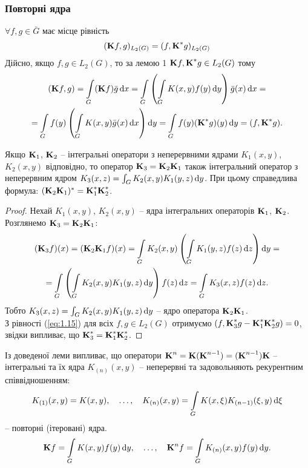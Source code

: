 \subsubsection{Повторні ядра}

$\forall f, g \in \bar G$ має місце рівність 
\begin{equation}
	\label{eq:1.15}
	(\bf{K}f,g)_{L_2(G)} = (f, \bf{K}^*g)_{L_2(G)}
\end{equation}
Дійсно, якщо $f, g \in L_2(G)$, то за лемою 1 $\bf{K}f, \bf{K}^*g \in L_2(G)$ тому
\begin{multline*}
	(\bf{K}f, g) = \Int_G (\bf{K}f)\bar g \diff x = \Int_G \left( \Int_G K(x, y) f(y) \diff y\right) \bar g(x) \diff x = \\
	= \Int_G f(y) \left( \Int_G K(x, y) \bar g(x) \diff x\right) \diff y = \Int_G f(y) (\bf{K}^* g)(y) \diff y = (f, \bf{K}^*g).
\end{multline*}

\begin{lemma}
	Якщо $\bf{K}_1$, $\bf{K}_2$ -- інтегральні оператори з неперервними ядрами $K_1(x, y)$, $K_2(x, y)$ відповідно, то оператор $\bf{K}_3 = \bf{K}_2 \bf{K}_1$ також інтегральний оператор з неперервним ядром $K_3(x, z) = \int_G K_2(x, y) K_1(y, z) \diff y$. При цьому справедлива формула: $(\bf{K}_2\bf{K}_1)^* = \bf{K}_1^* \bf{K}_2^*$.
\end{lemma}
\begin{proof}
	Нехай $K_1(x, y)$, $K_2(x, y)$ -- ядра інтегральних операторів $\bf{K}_1$, $\bf{K}_2$. Розглянемо $\bf{K}_3 = \bf{K}_2 \bf{K}_1$:
	\begin{multline*}
		(\bf{K}_3 f)(x) = (\bf{K}_2\bf{K}_1f)(x) = \Int_G K_2(x, y) \left( \Int_G K_1(y, z) f(z) \diff z \right) \diff y = \\
		= \Int_G \left( \Int_G K_2(x, y) K_1(y, z) \diff y\right) f(z) \diff z = \Int_G K_3(x, z) f(z) \diff z.
	\end{multline*}
	Тобто $K_3(x, z) = \int_G K_2(x, y) K_1(y, z) \diff y$ -- ядро оператора $\bf{K}_2\bf{K}_1$. \\

	З рівності (\ref{eq:1.15}) для всіх $f, g \in L_2(G)$ отримуємо $(f, \bf{K}_3^*g - \bf{K}_1^* \bf{K}_2^* g) = 0$, звідки випливає, що $\bf{K}_3^* = \bf{K}_1^* \bf{K}_2^*$.
\end{proof}

Із доведеної леми випливає, що оператори $\bf{K}^n = \bf{K} (\bf{K}^{n - 1}) = (\bf{K}^{n - 1})\bf{K}$ -- інтегральні та їх ядра $K_{(n)}(x, y)$ -- неперервні та задовольняють рекурентним співвідношенням:
\begin{equation}
	\label{eq:1.16}
	K_{(1)}(x, y) = K(x, y), \quad \ldots, \quad K_{(n)}(x, y) = \Int_G K(x, \xi) K_{(n - 1)}(\xi, y) \diff \xi
\end{equation}
-- повторні (ітеровані) ядра.
\[ \bf{K}f = \Int_G K(x, y) f(y) \diff y, \quad \ldots, \quad \bf{K}^n f = \Int_G K_{(n)}(x, y)f(y) \diff y. \]

